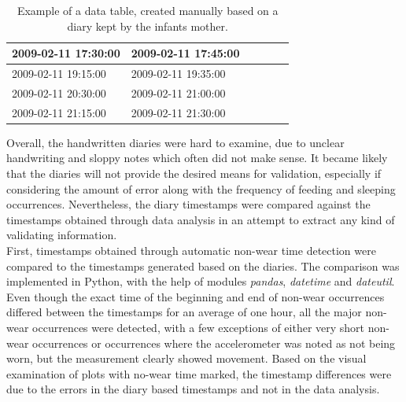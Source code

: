 \documentclass{article}
\begin{document}
{\begin{table}[h]
\begin{tabular}{|l|l|l|l|l|l|}
2009-02-11 17:30:00 & 2009-02-11 17:45:00 &                     &                     &                        &                     \\ \hline
2009-02-11 19:15:00 & 2009-02-11 19:35:00 &                     &                     &                        &                     \\ \hline
2009-02-11 20:30:00 & 2009-02-11 21:00:00 &                     &                     &                        &                     \\ \hline
2009-02-11 21:15:00 & 2009-02-11 21:30:00 &                     &                     &                        &                     \\ \hline
\end{tabular}
\caption{Example of a data table, created manually based on a diary kept by the infants mother.}
\end{table}
Overall, the handwritten diaries were hard to examine, due to unclear handwriting and sloppy notes which often did not make sense. It became likely that the diaries will not provide the desired means for validation, especially if considering the amount of error along with the frequency of feeding and sleeping occurrences. Nevertheless, the diary timestamps were compared against the timestamps obtained through data analysis in an attempt to extract any kind of validating information. \\
First, timestamps obtained through automatic non-wear time detection were compared to the timestamps generated based on the diaries. The comparison was implemented in Python, with the help of modules \textit{pandas}, \textit{datetime} and \textit{dateutil}. Even though the exact time of the beginning and end of non-wear occurrences differed between the timestamps for an average of one hour, all the major non-wear occurrences were detected, with a few exceptions of either very short non-wear occurrences or occurrences where the accelerometer was noted as not being worn, but the measurement clearly showed movement. Based on the visual examination of plots with no-wear time marked, the timestamp differences were due to the errors in the diary based timestamps and not in the data analysis.
}
\end{document}
